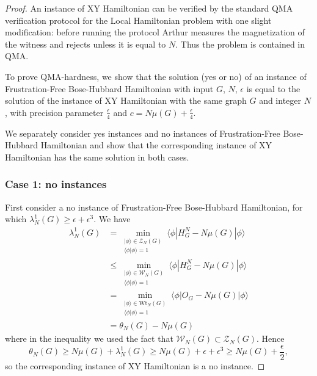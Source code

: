 \documentclass[../thesis-main/thesis-main]{subfiles}
\begin{document}
\begin{proof}
An instance of XY Hamiltonian can be verified by the standard QMA verification protocol for the Local Hamiltonian problem \cite{KSV02} with one slight modification: before running the protocol Arthur measures the magnetization of the witness and rejects unless it is equal to $N$.  Thus the problem is contained in QMA.
	
To prove QMA-hardness, we show that the solution (yes or no) of an instance of Frustration-Free Bose-Hubbard Hamiltonian with input $G$, $N$, $\epsilon$ is equal to the solution of the instance of XY Hamiltonian with the same graph $G$ and integer $N$, with precision parameter $\frac{\epsilon}{4}$ and $c=N\mu(G)+\frac{\epsilon}{4}$. 

We separately consider yes instances and no instances of Frustration-Free Bose-Hubbard Hamiltonian and show that the corresponding instance of XY Hamiltonian has the same solution in both cases.

\subsubsection*{Case 1: no instances}

First consider a no instance of Frustration-Free Bose-Hubbard Hamiltonian, for which $\lambda_N^1 (G)\geq \epsilon+\epsilon^3$.
We have
\begin{align}
\lambda_N^1 (G) & = \min_{\substack{|\phi\rangle\in \mathcal{Z}_N(G)\\ \langle \phi|\phi\rangle=1}} \langle \phi| H_G^N-N\mu(G)|\phi\rangle 
\label{eq:lambda_theta1}\\
& \leq \min_{\substack{|\phi\rangle\in \mathcal{W}_N(G)\\ \langle \phi|\phi\rangle=1}} \langle \phi| H_G^N-N\mu(G)|\phi\rangle
\label{eq:lambda_theta2}\\ & =\min_{\substack{|\phi\rangle\in \mathrm{Wt}_N(G)\\ \langle \phi|\phi\rangle=1}} \langle \phi| O_G-N\mu(G)|\phi\rangle
\label{eq:lambda_theta3} \\
&= \theta_N(G)-N\mu(G)
\label{eq:lambda_theta4}
\end{align}
where in the inequality we used the fact that $\mathcal{W}_N(G)\subset \mathcal{Z}_N(G)$. Hence 
\[
\theta_N(G)\geq N\mu(G)+\lambda_N^1 (G) \geq N\mu(G)+\epsilon+\epsilon^3\geq N\mu(G)+\frac{\epsilon}{2},
\]
so the corresponding instance of XY Hamiltonian is a no instance.


\end{proof}
\end{document}
